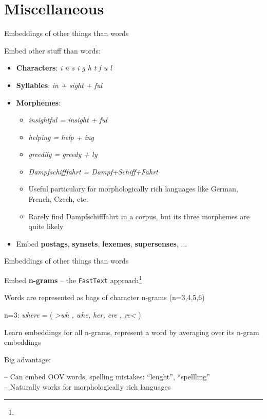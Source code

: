 \documentclass[12pt]{beamer}
\begin{document}
\section{Miscellaneous}


\begin{frame}{Embeddings of other things than words}

Embed other stuff than words:

\begin{itemize}
\item \textbf{Characters}: \emph{i n s i g h t f u l}
\item \textbf{Syllables}: \emph{in + sight + ful} 
\item \textbf{Morphemes}:
\begin{itemize}
	\item \emph{insightful = insight + ful}
	\item \emph{helping = help + ing}
	\item \emph{greedily = greedy + ly}
	\item \emph{Dampfschifffahrt = Dampf+Schiff+Fahrt}
	\item Useful particulary for morphologically rich languages like German, French, Czech, etc.
	\item Rarely find Dampfschifffahrt in a corpus, but its three morphemes are quite likely
\end{itemize}
\item Embed \textbf{postags}, \textbf{synsets}, \textbf{lexemes}, \textbf{supersenses}, ...
\end{itemize}	
\end{frame}


\begin{frame}{Embeddings of other things than words}
	
	
	Embed \textbf{n-grams} -- the \texttt{FastText} approach\footnote{
	}
	
	Words are represented as bags of character n-grams (n=3,4,5,6)
	
	
\begin{small}
n=3: \emph{where} = (  \emph{>wh , whe, her, ere , re<}  )
\end{small}

Learn embeddings for all n-grams, represent a word by averaging over its n-gram embeddings
	

\begin{small}
	Big advantage:
	
	-- 	Can embed OOV words, spelling mistakes: “lenght”, “spellling”  \\
	-- 	Naturally works for morphologically rich languages
\end{small}	
	
\end{frame}
\end{document}
